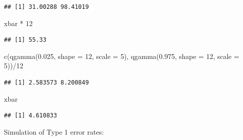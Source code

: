 \documentclass[
]{book}
\newenvironment{Shaded}{\begin{snugshade}}{\end{snugshade}}
\newcommand{\AttributeTok}[1]{\textcolor[rgb]{0.77,0.63,0.00}{#1}}
\newcommand{\DecValTok}[1]{\textcolor[rgb]{0.00,0.00,0.81}{#1}}
\newcommand{\FloatTok}[1]{\textcolor[rgb]{0.00,0.00,0.81}{#1}}
\newcommand{\FunctionTok}[1]{\textcolor[rgb]{0.00,0.00,0.00}{#1}}
\newcommand{\NormalTok}[1]{#1}
\newcommand{\SpecialCharTok}[1]{\textcolor[rgb]{0.00,0.00,0.00}{#1}}
\begin{document}
\begin{verbatim}
## [1] 31.00288 98.41019
\end{verbatim}

\begin{Shaded}
\begin{Highlighting}[]
\NormalTok{xbar }\SpecialCharTok{*} \DecValTok{12}
\end{Highlighting}
\end{Shaded}

\begin{verbatim}
## [1] 55.33
\end{verbatim}

\begin{Shaded}
\begin{Highlighting}[]
\FunctionTok{c}\NormalTok{(}\FunctionTok{qgamma}\NormalTok{(}\FloatTok{0.025}\NormalTok{, }\AttributeTok{shape =} \DecValTok{12}\NormalTok{, }\AttributeTok{scale =} \DecValTok{5}\NormalTok{), }\FunctionTok{qgamma}\NormalTok{(}\FloatTok{0.975}\NormalTok{, }\AttributeTok{shape =} \DecValTok{12}\NormalTok{, }\AttributeTok{scale =} \DecValTok{5}\NormalTok{))}\SpecialCharTok{/}\DecValTok{12}
\end{Highlighting}
\end{Shaded}

\begin{verbatim}
## [1] 2.583573 8.200849
\end{verbatim}

\begin{Shaded}
\begin{Highlighting}[]
\NormalTok{xbar}
\end{Highlighting}
\end{Shaded}

\begin{verbatim}
## [1] 4.610833
\end{verbatim}

Simulation of Type 1 error rates:
\end{document}
